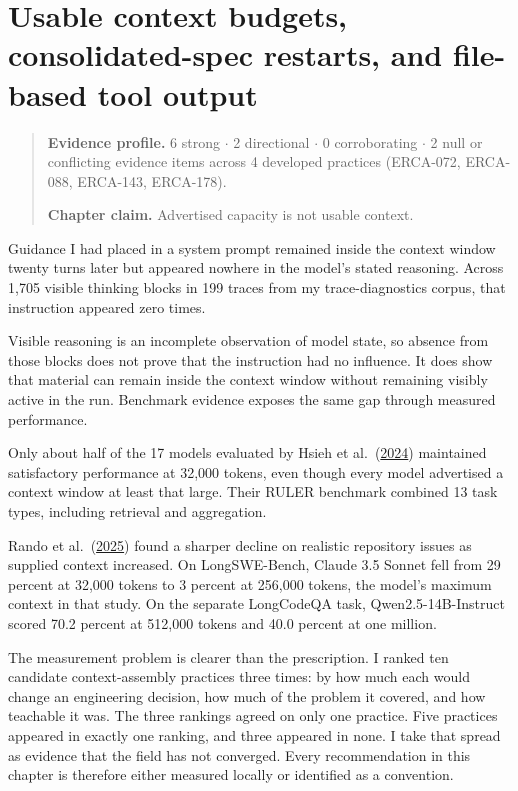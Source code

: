 \chapter{Usable context budgets, consolidated-spec restarts, and file-based tool output}
\label{ch13-usable-context-budgets-spec-restarts-file-output}
\begin{quote}
\textbf{Evidence profile.} 6 strong \(\cdot\) 2 directional \(\cdot\) 0 corroborating \(\cdot\) 2 null or conflicting evidence items across 4 developed practices (ERCA-072, ERCA-088, ERCA-143, ERCA-178).

\textbf{Chapter claim.} Advertised capacity is not usable context.
\end{quote}

Guidance I had placed in a system prompt remained inside the context window twenty turns later but appeared nowhere in the model's stated reasoning. Across 1,705 visible thinking blocks in 199 traces from my trace-diagnostics corpus, that instruction appeared zero times.

Visible reasoning is an incomplete observation of model state, so absence from those blocks does not prove that the instruction had no influence. It does show that material can remain inside the context window without remaining visibly active in the run. Benchmark evidence exposes the same gap through measured performance.

Only about half of the 17 models evaluated by Hsieh et al.~(\href{https://arxiv.org/abs/2404.06654}{2024}) maintained satisfactory performance at 32,000 tokens, even though every model advertised a context window at least that large. Their RULER benchmark combined 13 task types, including retrieval and aggregation.

Rando et al.~(\href{https://arxiv.org/abs/2505.07897}{2025}) found a sharper decline on realistic repository issues as supplied context increased. On LongSWE-Bench, Claude 3.5 Sonnet fell from 29 percent at 32,000 tokens to 3 percent at 256,000 tokens, the model's maximum context in that study. On the separate LongCodeQA task, Qwen2.5-14B-Instruct scored 70.2 percent at 512,000 tokens and 40.0 percent at one million.

The measurement problem is clearer than the prescription. I ranked ten candidate context-assembly practices three times: by how much each would change an engineering decision, how much of the problem it covered, and how teachable it was. The three rankings agreed on only one practice. Five practices appeared in exactly one ranking, and three appeared in none. I take that spread as evidence that the field has not converged. Every recommendation in this chapter is therefore either measured locally or identified as a convention.

